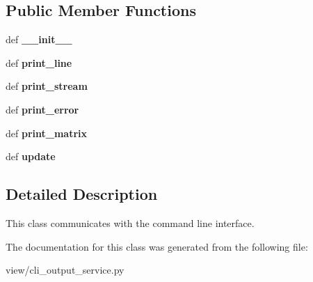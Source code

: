 \subsection*{Public Member Functions}
\begin{DoxyCompactItemize}
\item 
\mbox{\label{classmodules_1_1view_1_1cli__output__service_1_1_c_l_i_output_service_a777a859ed6855c90b03ba584f58f556f}} 
def {\bfseries \+\_\+\+\_\+init\+\_\+\+\_\+}
\item 
\mbox{\label{classmodules_1_1view_1_1cli__output__service_1_1_c_l_i_output_service_a4619163f2befb2f23a4b264ca9f45671}} 
def {\bfseries print\+\_\+line}
\item 
\mbox{\label{classmodules_1_1view_1_1cli__output__service_1_1_c_l_i_output_service_a0c72cb551e3aec0fff8e974c4753313d}} 
def {\bfseries print\+\_\+stream}
\item 
\mbox{\label{classmodules_1_1view_1_1cli__output__service_1_1_c_l_i_output_service_aa6da2cbfdf0dd03bc3cd74f95f1c5341}} 
def {\bfseries print\+\_\+error}
\item 
\mbox{\label{classmodules_1_1view_1_1cli__output__service_1_1_c_l_i_output_service_aaf98b3df313fb3f3ca4b1c7813de5934}} 
def {\bfseries print\+\_\+matrix}
\item 
\mbox{\label{classmodules_1_1view_1_1cli__output__service_1_1_c_l_i_output_service_a569d58a259b9b569afd36b34c1d09f81}} 
def {\bfseries update}
\end{DoxyCompactItemize}


\subsection{Detailed Description}
This class communicates with the command line interface. 

The documentation for this class was generated from the following file\+:\begin{DoxyCompactItemize}
\item 
view/cli\+\_\+output\+\_\+service.\+py\end{DoxyCompactItemize}
